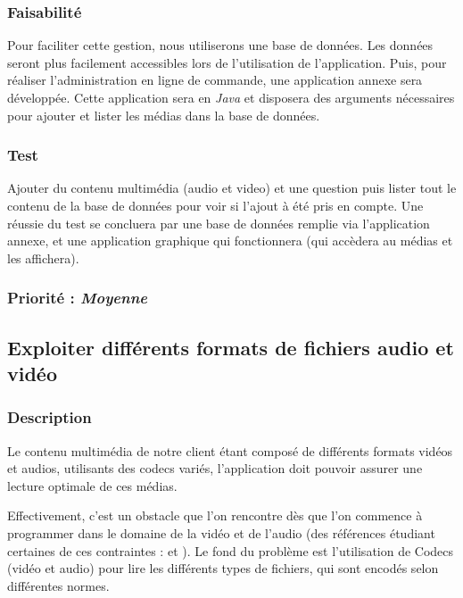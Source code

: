 \subsubsection{Faisabilité}

Pour faciliter cette gestion, nous utiliserons une base de données. Les données seront plus facilement accessibles lors de l’utilisation de l’application.
Puis, pour réaliser l'administration en ligne de commande, une application annexe sera développée. Cette application sera en \textit{Java} et disposera des arguments nécessaires pour ajouter et lister les médias dans la base de données.

\subsubsection{Test}

Ajouter du contenu multimédia (audio et video) et une question puis lister tout le contenu de la base de données pour voir si l’ajout à été pris en compte.
Une réussie du test se concluera par une base de données remplie via l'application annexe, et une application graphique qui fonctionnera (qui accèdera au médias et les affichera).

\subsubsection{Priorité : \textit{Moyenne}}

\subsection{Exploiter différents formats de fichiers audio et vidéo}

\subsubsection{Description}

Le contenu multimédia de notre client étant composé de différents formats vidéos et audios, utilisants des codecs variés, l’application doit pouvoir assurer une lecture optimale de ces médias.

Effectivement, c’est un obstacle que l’on rencontre dès que l’on commence à programmer dans le domaine de la vidéo et de l’audio (des références étudiant certaines de ces contraintes : \cite{ghanbari1999video} et \cite{he2013introduction}).
Le fond du problème est l’utilisation de Codecs (vidéo et audio) pour lire les différents types de fichiers, qui sont encodés selon différentes normes.

